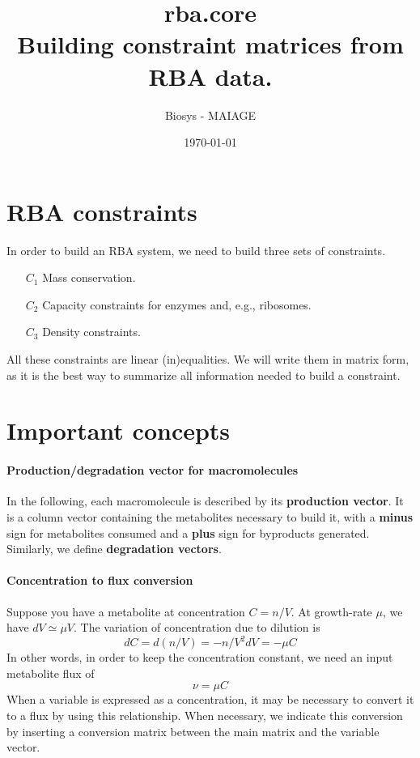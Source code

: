 \documentclass[12pt]{scrartcl}
\theoremstyle{definition}
\theoremstyle{remark}
\numberwithin{equation}{section}
\begin{document}
\title{rba.core\\ Building constraint matrices from RBA data.}%
\author{Biosys - MAIAGE}%
\date{\today}%

\maketitle

\newpage

\tableofcontents

\newpage

\section{RBA constraints}

In order to build an RBA system, we need to build three sets of constraints.

\begin{itemize}
  \item[$C_1$] Mass conservation.
  \item[$C_2$] Capacity constraints for enzymes and, e.g., ribosomes.
  \item[$C_3$] Density constraints.
\end{itemize}

All these constraints are linear (in)equalities.
We will write them in matrix form, as it is the best way to summarize
all information needed to build a constraint.

\section{Important concepts}

\paragraph{Production/degradation vector for macromolecules}
In the following, each macromolecule is described by its \textbf{production vector}.
It is a column vector containing the metabolites necessary to build it,
with a \textbf{minus} sign for metabolites consumed and a \textbf{plus} sign for byproducts generated.
Similarly, we define \textbf{degradation vectors}.

\paragraph{Concentration to flux conversion}
Suppose you have a metabolite at concentration $C = n/V$.
At growth-rate $\mu$, we have $dV \simeq \mu V$.
The variation of concentration due to dilution is
\[
  dC = d(n/V) = -n/V^2 dV = -\mu C
\]
In other words, in order to keep the concentration constant,
we need an input metabolite flux of
\[
  \nu = \mu C
\]
When a variable is expressed as a concentration, it may be necessary to
convert it to a flux by using this relationship.
When necessary, we indicate this conversion by inserting a conversion
matrix between the main matrix and the variable vector.
\end{document}
